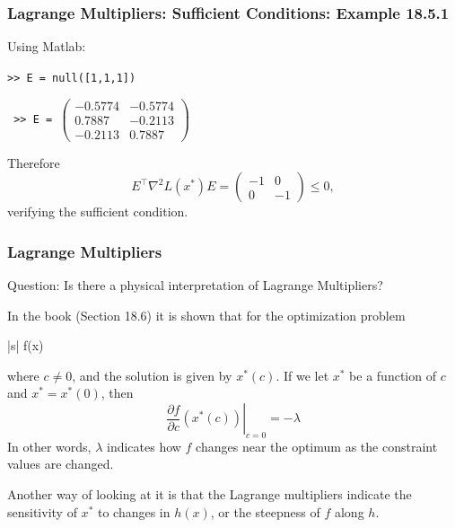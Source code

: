 \documentclass{beamer}
\begin{document}
\begin{frame}\frametitle{Lagrange Multipliers: Sufficient Conditions: Example 18.5.1}
	Using Matlab:
	
	\vfill
	
	\texttt{>> E = null([1,1,1])}
	
	\vfill
	
	\texttt{
		>> E = $\begin{pmatrix}
	   			-0.5774 & -0.5774 \\
	    		0.7887 & -0.2113 \\
	   			-0.2113 & 0.7887
	   		\end{pmatrix}$
	}
	
	\vfill
	
	Therefore
	\[
	 	E^\top \nabla^2 L(x^{\ast})E 
	 		= \begin{pmatrix}
	    		-1 & 0\\
	    		0 & -1
	  		  \end{pmatrix} \leq 0,
	\]	
	verifying the sufficient condition.
\end{frame}

\begin{frame}\frametitle{Lagrange Multipliers}
	{\color{blue}Question: Is there a physical interpretation of Lagrange Multipliers?}
	
	
	
	In the book (Section 18.6) it is shown that for the optimization problem
	\begin{mini*}|s|
		{}{f(x)}{}{}
	\end{mini*}
	where $c\neq 0$, and the solution is given by $x^\ast(c)$.  If we let $x^\ast$ be a function of $c$ and $x^{\ast} = x^\ast(0)$, then
	\[ 
		\left. \frac{\partial f}{\partial c}(x^\ast(c))\right|_{c = 0} = -\lambda 
	\]
	In other words, $\lambda$ indicates how $f$ changes near the optimum as the constraint values are changed.
	
	\vfill
	
	Another way of looking at it is that the Lagrange multipliers indicate the sensitivity of $x^{\ast}$ to changes in $h(x)$, or the steepness of $f$ along $h$.
\end{frame}

	
\end{document}
